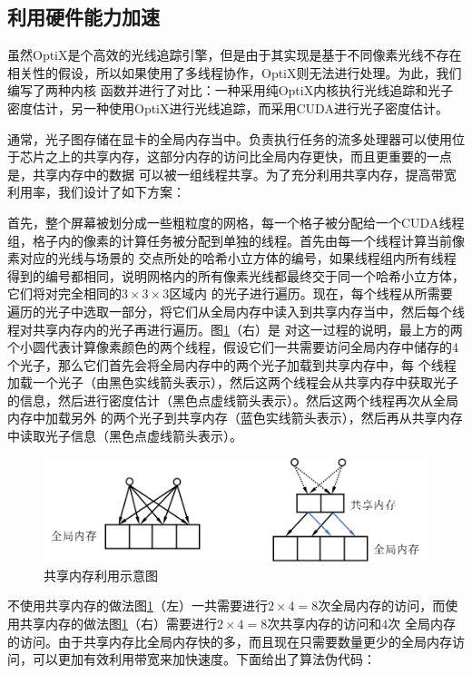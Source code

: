 \documentclass[UTF8]{ctexart}
\begin{document}
    \subsection{利用硬件能力加速}
        虽然OptiX是个高效的光线追踪引擎，但是由于其实现是基于不同像素光线不存在相关性的假设，所以如果使用了多线程协作，OptiX则无法进行处理。为此，我们编写了两种内核
        函数并进行了对比：一种采用纯OptiX内核执行光线追踪和光子密度估计，另一种使用OptiX进行光线追踪，而采用CUDA进行光子密度估计。
        
        通常，光子图存储在显卡的全局内存当中。负责执行任务的流多处理器可以使用位于芯片之上的共享内存，这部分内存的访问比全局内存更快，而且更重要的一点是，共享内存中的数据
        可以被一组线程共享。为了充分利用共享内存，提高带宽利用率，我们设计了如下方案：
        
        首先，整个屏幕被划分成一些粗粒度的网格，每一个格子被分配给一个CUDA线程组，格子内的像素的计算任务被分配到单独的线程。首先由每一个线程计算当前像素对应的光线与场景的
        交点所处的哈希小立方体的编号，如果线程组内所有线程得到的编号都相同，说明网格内的所有像素光线都最终交于同一个哈希小立方体，它们将对完全相同的$3\times3\times3$区域内
        的光子进行遍历。现在，每个线程从所需要遍历的光子中选取一部分，将它们从全局内存中读入到共享内存当中，然后每个线程对共享内存内的光子再进行遍历。图\ref{fig:5}（右）是
        对这一过程的说明，最上方的两个小圆代表计算像素颜色的两个线程，假设它们一共需要访问全局内存中储存的4个光子，那么它们首先会将全局内存中的两个光子加载到共享内存中，每
        个线程加载一个光子（由黑色实线箭头表示），然后这两个线程会从共享内存中获取光子的信息，然后进行密度估计（黑色点虚线箭头表示）。然后这两个线程再次从全局内存中加载另外
        的两个光子到共享内存（蓝色实线箭头表示），然后再从共享内存中读取光子信息（黑色点虚线箭头表示）。
        
        \begin{figure}[htbp]
        \centering
        \includegraphics[scale=0.7]{pic/SharedMemory.png}
        \caption{共享内存利用示意图}
        \label{fig:5}
        \end{figure}
        
        不使用共享内存的做法图\ref{fig:5}（左）一共需要进行$2\times4=8$次全局内存的访问，而使用共享内存的做法图\ref{fig:5}（右）需要进行$2\times4=8$次共享内存的访问和$4$次
        全局内存的访问。由于共享内存比全局内存快的多，而且现在只需要数量更少的全局内存访问，可以更加有效利用带宽来加快速度。下面给出了算法伪代码：
        
\end{document}
